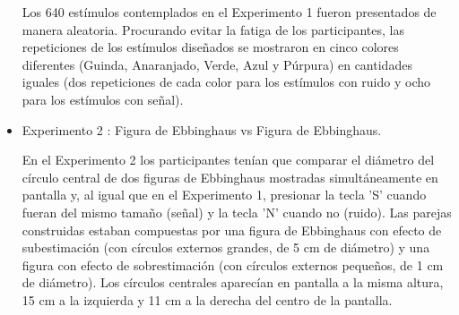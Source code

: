 \begin{itemize}
Los 640 estímulos contemplados en el Experimento 1 fueron presentados de manera aleatoria. Procurando evitar la fatiga de los participantes, las repeticiones de los estímulos diseñados se mostraron en cinco colores diferentes (Guinda, Anaranjado, Verde, Azul y Púrpura) en cantidades iguales (dos repeticiones de cada color para los estímulos con ruido y ocho para los estímulos con señal).\\

\item Experimento 2 : Figura de Ebbinghaus vs Figura de Ebbinghaus.

En el Experimento 2 los participantes tenían que comparar el diámetro del círculo central de dos figuras de Ebbinghaus mostradas simultáneamente en pantalla y, al igual que en el Experimento 1, presionar la tecla 'S' cuando fueran del mismo tamaño (señal) y la tecla 'N' cuando no (ruido). Las parejas construidas estaban compuestas por una figura de Ebbinghaus con efecto de subestimación (con círculos externos grandes, de 5 cm de diámetro) y una figura con efecto de sobrestimación (con círculos externos pequeños, de 1 cm de diámetro). Los círculos centrales aparecían en pantalla a la misma altura, 15 cm a la izquierda y 11 cm a la derecha del centro de la pantalla.\\



\end{itemize}
